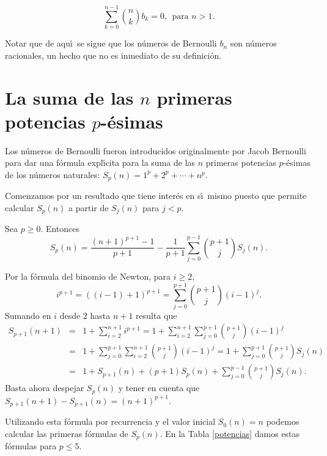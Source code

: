 \begin{equation}\label{RecurrenciaBernoulli}\sum_{k=0}^{n-1}{n\choose k}b_k=0,\ \ \text{para } n>1.\end{equation}

Notar que de aqu\'\i\ se sigue que los n\'umeros de Bernoulli $b_n$ son n\'umeros racionales, un hecho que no es inmediato de su definici\'on.

\section{La suma de las $n$ primeras potencias $p$-\'esimas}

Los n\'umeros de Bernoulli fueron introducidos originalmente por Jacob Bernoulli para dar una f\'ormula expl\'\i cita para la suma de las $n$ primeras potencias $p$-\'esimas de los n\'umeros naturales: $S_p(n)=1^p+2^p+\cdots +n^p$.

Comenzamos por un  resultado que tiene inter\'es en s\'\i\ mismo puesto que permite calcular $S_p(n)$ a partir de $S_j(n)$ para $j<p$.

\begin{proposicion}\label{RecurrenciaSumaPotencias} Sea $p\geq 0$. Entonces
$$S_p(n)=\frac{(n+1)^{p+1}-1}{p+1}-\frac{1}{p+1}\sum_{j=0}^{p-1}{p+1\choose j}S_j(n).$$
\end{proposicion}

\begin{demostracion}
Por la f\'ormula del binomio de Newton, para $i\geq 2$,
$$i^{p+1}=((i-1)+1)^{p+1}=\sum_{j=0}^{p+1}{p+1\choose j}(i-1)^j.$$
Sumando en $i$ desde $2$ hasta $n+1$ resulta que
\begin{eqnarray*}
S_{p+1}(n+1) &=& 1+\sum_{i=2}^{n+1}i^{p+1}=1+\sum_{i=2}^{n+1}\sum _{j=0}^{p+1}{p+1\choose j}(i-1)^j\\  &=& 1+\sum_{j=0}^{p+1}\sum_{i=2}^{n+1}{p+1\choose j}(i-1)^ j= 1+\sum_{j=0}^{p+1}{p+1\choose j}S_j(n)\\ &=& 1+S_{p+1}(n)+(p+1)S_p(n)+\sum_{j=0}^{p-1}{p+1\choose j}S_j(n).\end{eqnarray*}
Basta ahora despejar $S_p(n)$ y tener en cuenta que $S_{p+1}(n+1)-S_{p+1}(n)=(n+1)^{p+1}$.
\end{demostracion}

Utilizando esta f\'ormula por recurrencia y el valor inicial $S_0(n)=n$ podemos calcular las primeras f\'ormulas de $S_p(n)$. En la Tabla \ref{potencias} damos estas f\'ormulas para $p\leq 5$.


